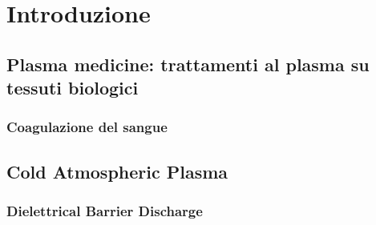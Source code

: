 \chapter{Introduzione}

\section{Plasma medicine: trattamenti al plasma su tessuti biologici}
\subsection{Coagulazione del sangue}
\section{Cold Atmospheric Plasma}
\subsection{Dielettrical Barrier Discharge}

\label{ch:intro}


